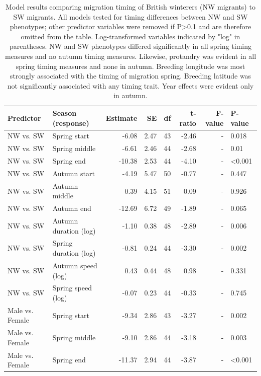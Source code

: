 \documentclass[a4paper, twoside]{templates/ociamthesis}
\begin{document}
\begin{table}[t]

\caption{\label{tab:nw-timing-table}Model results comparing migration timing of British winterers (NW migrants) to SW migrants. All models tested for timing differences between NW and SW phenotypes; other predictor variables were removed if P>0.1 and are therefore omitted from the table. Log-transformed variables indicated by "log" in parentheses. NW and SW phenotypes differed significantly in all spring timing measures and no autumn timing measures. Likewise, protandry was evident in all spring timing measures and none in autumn. Breeding longitude was most strongly associated with the timing of migration spring. Breeding latitude was not significantly associated with any timing trait. Year effects were evident only in autumn.}
\centering
\fontsize{9.5}{11.5}\selectfont
\begin{tabular}{l|l|r|r|r|r|r|l}
\hline
Predictor & Season (response) & Estimate & SE & df & t-ratio & F-value & P-value\\
\hline
NW vs. SW & Spring start & -6.08 & 2.47 & 43 & -2.46 & - & 0.018\\
\hline
NW vs. SW & Spring middle & -6.61 & 2.46 & 44 & -2.68 & - & 0.01\\
\hline
NW vs. SW & Spring end & -10.38 & 2.53 & 44 & -4.10 & - & <0.001\\
\hline
NW vs. SW & Autumn start & -4.19 & 5.47 & 50 & -0.77 & - & 0.447\\
\hline
NW vs. SW & Autumn middle & 0.39 & 4.15 & 51 & 0.09 & - & 0.926\\
\hline
NW vs. SW & Autumn end & -12.69 & 6.72 & 49 & -1.89 & - & 0.065\\
\hline
NW vs. SW & Autumn duration (log) & -1.10 & 0.38 & 48 & -2.89 & - & 0.006\\
\hline
NW vs. SW & Spring duration (log) & -0.81 & 0.24 & 44 & -3.30 & - & 0.002\\
\hline
NW vs. SW & Autumn speed (log) & 0.43 & 0.44 & 48 & 0.98 & - & 0.331\\
\hline
NW vs. SW & Spring speed (log) & -0.07 & 0.23 & 44 & -0.33 & - & 0.745\\
\hline
Male vs. Female & Spring start & -9.34 & 2.86 & 43 & -3.27 & - & 0.002\\
\hline
Male vs. Female & Spring middle & -9.10 & 2.86 & 44 & -3.18 & - & 0.003\\
\hline
Male vs. Female & Spring end & -11.37 & 2.94 & 44 & -3.87 & - & <0.001\\

\end{tabular}
\end{table}
\end{document}
